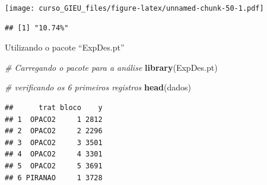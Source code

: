 \documentclass[
]{book}
\newenvironment{Shaded}{\begin{snugshade}}{\end{snugshade}}
\newcommand{\CommentTok}[1]{\textcolor[rgb]{0.56,0.35,0.01}{\textit{#1}}}
\newcommand{\DataTypeTok}[1]{\textcolor[rgb]{0.13,0.29,0.53}{#1}}
\newcommand{\DecValTok}[1]{\textcolor[rgb]{0.00,0.00,0.81}{#1}}
\newcommand{\KeywordTok}[1]{\textcolor[rgb]{0.13,0.29,0.53}{\textbf{#1}}}
\newcommand{\NormalTok}[1]{#1}
\newcommand{\OperatorTok}[1]{\textcolor[rgb]{0.81,0.36,0.00}{\textbf{#1}}}
\newcommand{\StringTok}[1]{\textcolor[rgb]{0.31,0.60,0.02}{#1}}
\begin{document}
\texttt{[image: curso\_GIEU\_files/figure-latex/unnamed-chunk-50-1.pdf]}

\begin{Shaded}
\end{Shaded}

\begin{verbatim}
## [1] "10.74%"
\end{verbatim}

Utilizando o pacote ``ExpDes.pt''

\begin{Shaded}
\begin{Highlighting}[]
\CommentTok{# Carregando o pacote para a análise}
\KeywordTok{library}\NormalTok{(ExpDes.pt)}

\CommentTok{# verificando os 6 primeiros registros}
\KeywordTok{head}\NormalTok{(dados)}
\end{Highlighting}
\end{Shaded}

\begin{verbatim}
##      trat bloco    y
## 1  OPACO2     1 2812
## 2  OPACO2     2 2296
## 3  OPACO2     3 3501
## 4  OPACO2     4 3301
## 5  OPACO2     5 3691
## 6 PIRANAO     1 3728
\end{verbatim}

\begin{Shaded}
\end{Shaded}
\end{document}
